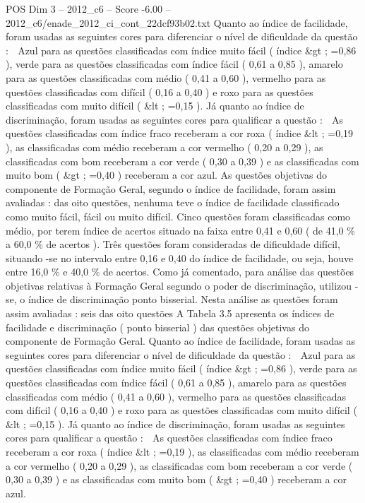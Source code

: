 \begin{textsample}{POS Dim 3 – 2012\_c6 – Score -6.00 – 2012\_c6/enade\_2012\_ci\_cont\_22dcf93b02.txt}
Quanto ao índice de facilidade, foram usadas as seguintes cores para diferenciar o nível de dificuldade da questão :  Azul para as questões classificadas com índice muito fácil ( índice \&gt ; =0,86 ), verde para as questões classificadas com índice fácil ( 0,61 a 0,85 ), amarelo para as questões classificadas com médio ( 0,41 a 0,60 ), vermelho para as questões classificadas com difícil ( 0,16 a 0,40 ) e roxo para as questões classificadas com muito difícil ( \&lt ; =0,15 ).
Já quanto ao índice de discriminação, foram usadas as seguintes cores para qualificar a questão :  As questões classificadas com índice fraco receberam a cor roxa ( índice \&lt ; =0,19 ), as classificadas com médio receberam a cor vermelho ( 0,20 a 0,29 ), as classificadas com bom receberam a cor verde ( 0,30 a 0,39 ) e as classificadas com muito bom ( \&gt ; =0,40 ) receberam a cor azul.
As questões objetivas do componente de Formação Geral, segundo o índice de facilidade, foram assim avaliadas : das oito questões, nenhuma teve o índice de facilidade classificado como muito fácil, fácil ou muito difícil.
Cinco questões foram classificadas como médio, por terem índice de acertos situado na faixa entre 0,41 e 0,60 ( de 41,0 \% a 60,0 \% de acertos ).
Três questões foram consideradas de dificuldade difícil, situando -se no intervalo entre 0,16 e 0,40 do índice de facilidade, ou seja, houve entre 16,0 \% e 40,0 \% de acertos.
Como já comentado, para análise das questões objetivas relativas à Formação Geral segundo o poder de discriminação, utilizou -se, o índice de discriminação ponto bisserial.
Nesta análise as questões foram assim avaliadas : seis das oito questões A Tabela 3.5 apresenta os índices de facilidade e discriminação ( ponto bisserial ) das questões objetivas do componente de Formação Geral.
Quanto ao índice de facilidade, foram usadas as seguintes cores para diferenciar o nível de dificuldade da questão :  Azul para as questões classificadas com índice muito fácil ( índice \&gt ; =0,86 ), verde para as questões classificadas com índice fácil ( 0,61 a 0,85 ), amarelo para as questões classificadas com médio ( 0,41 a 0,60 ), vermelho para as questões classificadas com difícil ( 0,16 a 0,40 ) e roxo para as questões classificadas com muito difícil ( \&lt ; =0,15 ).
Já quanto ao índice de discriminação, foram usadas as seguintes cores para qualificar a questão :  As questões classificadas com índice fraco receberam a cor roxa ( índice \&lt ; =0,19 ), as classificadas com médio receberam a cor vermelho ( 0,20 a 0,29 ), as classificadas com bom receberam a cor verde ( 0,30 a 0,39 ) e as classificadas com muito bom ( \&gt ; =0,40 ) receberam a cor azul.

\end{textsample}
